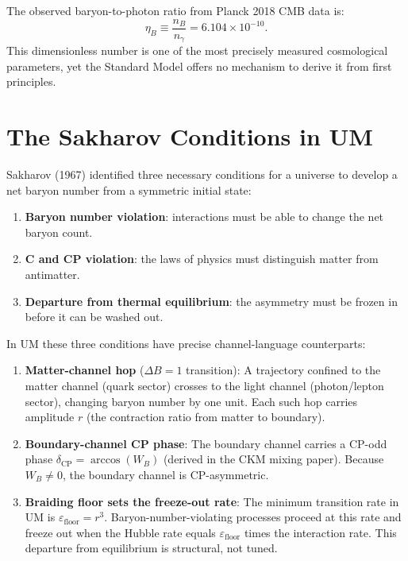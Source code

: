 \documentclass[12pt]{article}
\begin{document}
The observed baryon-to-photon ratio from Planck 2018 CMB data is:
\begin{equation}
  \eta_B \equiv \frac{n_B}{n_\gamma} = 6.104 \times 10^{-10}.
  \label{eq:eta_obs}
\end{equation}
This dimensionless number is one of the most precisely measured
cosmological parameters, yet the Standard Model offers no mechanism to
derive it from first principles.

\section{The Sakharov Conditions in UM}

Sakharov (1967) identified three necessary conditions for a universe to
develop a net baryon number from a symmetric initial state:

\begin{enumerate}
  \item \textbf{Baryon number violation}: interactions must be able to
    change the net baryon count.
  \item \textbf{C and CP violation}: the laws of physics must
    distinguish matter from antimatter.
  \item \textbf{Departure from thermal equilibrium}: the asymmetry
    must be frozen in before it can be washed out.
\end{enumerate}

In UM these three conditions have precise channel-language
counterparts:

\begin{enumerate}
  \item \textbf{Matter-channel hop} ($\Delta B = 1$ transition):
    A trajectory confined to the matter channel (quark sector)
    crosses to the light channel (photon/lepton sector), changing
    baryon number by one unit. Each such hop carries amplitude $r$
    (the contraction ratio from matter to boundary).
  \item \textbf{Boundary-channel CP phase}: The boundary channel
    carries a CP-odd phase $\delta_{\text{CP}} = \arccos(W_B)$
    (derived in the CKM mixing paper). Because $W_B \neq 0$, the
    boundary channel is CP-asymmetric.
  \item \textbf{Braiding floor sets the freeze-out rate}: The minimum
    transition rate in UM is $\varepsilon_{\text{floor}} = r^3$.
    Baryon-number-violating processes proceed at this rate and freeze
    out when the Hubble rate equals $\varepsilon_{\text{floor}}$
    times the interaction rate. This departure from equilibrium is
    structural, not tuned.
\end{enumerate}
\end{document}
